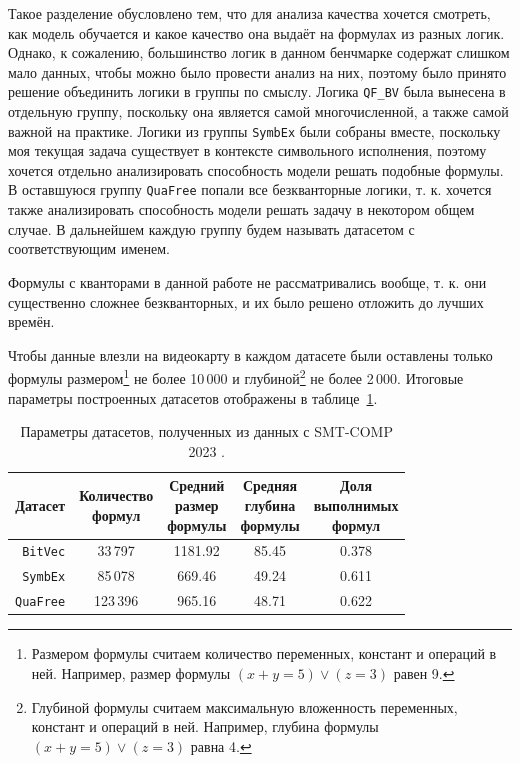 Такое разделение обусловлено тем, что для анализа качества хочется смотреть, как модель обучается и какое качество она выдаёт на формулах из разных логик. Однако, к сожалению, большинство логик в данном бенчмарке содержат слишком мало данных, чтобы можно было провести анализ на них, поэтому было принято решение объединить логики в группы по смыслу. Логика \texttt{QF\_BV} была вынесена в отдельную группу, поскольку она является самой многочисленной, а также самой важной на практике. Логики из группы \texttt{SymbEx} были собраны вместе, поскольку моя текущая задача существует в контексте символьного исполнения, поэтому хочется отдельно анализировать способность модели решать подобные формулы. В оставшуюся группу \texttt{QuaFree} попали все безкванторные логики, т. к. хочется также анализировать способность модели решать задачу в некотором общем случае. В дальнейшем каждую группу будем называть датасетом с соответствующим именем.

Формулы с кванторами в данной работе не рассматривались вообще, т. к. они существенно сложнее безкванторных, и их было решено отложить до лучших времён.

Чтобы данные влезли на видеокарту в каждом датасете были оставлены только формулы размером\footnote{Размером формулы считаем количество переменных, констант и операций в ней. Например, размер формулы $(x + y = 5) \vee (z = 3)$ равен 9.} не более 10\,000 и глубиной\footnote{Глубиной формулы считаем максимальную вложенность переменных, констант и операций в ней. Например, глубина формулы $(x + y = 5) \vee (z = 3)$ равна 4.} не более 2\,000. Итоговые параметры построенных датасетов отображены в таблице~\ref{smt-comp-datasets-table}.

\begin{table}[ht]
\begin{center}
\begin{tabular}{r|cccc}
    Датасет & \makecell{Количество \\ формул} & \makecell{Средний \\ размер \\ формулы} & \makecell{Средняя \\ глубина \\ формулы} & \makecell{Доля \\ выполнимых \\ формул} \\
    \hline \hline
    \rule{0pt}{2.5ex}
    \texttt{BitVec} & 33\,797 & 1181.92 & 85.45 & 0.378 \\
    \texttt{SymbEx} & 85\,078 & 669.46 & 49.24 & 0.611 \\
    \texttt{QuaFree} & 123\,396 & 965.16 & 48.71 & 0.622 \\
\end{tabular}
\caption{\label{smt-comp-datasets-table} Параметры датасетов, полученных из данных с SMT-COMP 2023 \cite{smt-comp-2023-benchmarks}.}
\end{center}
\end{table}

